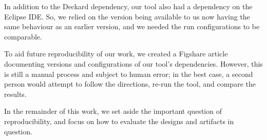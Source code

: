In addition to the Deckard dependency, our tool also had a dependency on the Eclipse IDE. So, we relied on the version being available to us now having the same behaviour as an earlier version, and we needed the run configurations to be comparable.

To aid future reproducibility of our work, we created a Figshare article documenting versions and configurations of our tool's dependencies. However, this is still a manual process and subject to human error; in the best case, a second person would attempt to follow the directions, re-run the tool, and compare the results.

In the remainder of this work, we set aside the important question of reproducibility, and focus on how to evaluate the designs and artifacts in question.
